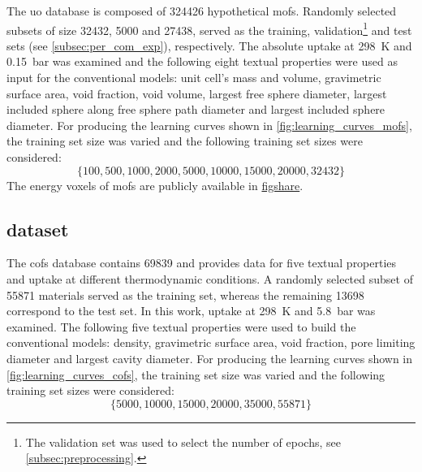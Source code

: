 The \gls{uo} database is composed of \num{324426} hypothetical
\glspl{mof}. Randomly selected subsets of size
\num{32432}, \num{5000} and \num{27438}, served as the training, validation\footnote{The validation set was used to
select the number of epochs, see \Section{} \ref{subsec:preprocessing}.} and test
sets (see \Section{} \ref{subsec:per_com_exp}), respectively. The
absolute  uptake at \SI{298}{\kelvin} and \SI{0.15}{\bar} was examined
and the following eight textual properties were used
as input for the conventional models: unit cell's mass and volume, gravimetric
surface area, void fraction, void volume, largest free sphere diameter, largest
included sphere along free sphere path diameter and largest included sphere
diameter. For producing the learning curves shown in
\Figure{} \ref{fig:learning_curves_mofs}, the training set size was varied and
the following training set sizes were considered:
\begin{equation}
	\{
		\num{100}, \num{500}, \num{1000},
		\num{2000}, \num{5000}, \num{10000},
		\num{15000}, \num{20000}, \num{32432}
	\}
\end{equation}
The energy voxels of \glspl{mof} are publicly available in
\href{https://figshare.com/articles/dataset/RetNet/24598845}{figshare}.

\subsection{ dataset}

The \glspl{cof} database contains \num{69839} and provides data for five textual
properties and  uptake at different thermodynamic
conditions. A randomly selected subset of
\num{55871} materials served as the training set, whereas the remaining
\num{13698} correspond to the test set. In this work,  uptake at
\SI{298}{\kelvin} and \SI{5.8}{\bar} was examined. The following five textual properties
were used to build the conventional models: density, gravimetric surface area,
void fraction, pore limiting diameter and largest cavity diameter.
For producing the learning curves shown in \Figure{}
\ref{fig:learning_curves_cofs}, the training set size was varied and the following
training set sizes were considered:
\begin{equation}
	\{
		\num{5000}, \num{10000}, \num{15000},
		\num{20000}, \num{35000}, \num{55871}
	\}
\end{equation}

